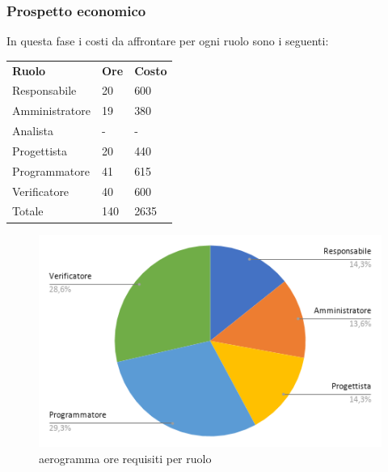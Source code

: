     \subsubsection{Prospetto economico}
    In questa fase i costi da affrontare per ogni ruolo sono i seguenti:

        \begin{center}
            \begin{table}[ht!]
                \centering
                \renewcommand{\arraystretch}{1.8}
                \begin{tabular}{p{75px} p{20px} p{30px}}
                    \rowcolor{logo!70} \textbf{Ruolo} & \textbf{Ore} & \textbf{Costo}\\
                    Responsabile & 20 & 600 \\
                    Amministratore & 19 & 380 \\
                    Analista & - & - \\
                    Progettista & 20 & 440 \\
                    Programmatore & 41 & 615 \\
                    Verificatore & 40 & 600  \\
                    Totale & 140 & 2635 \\
                \end{tabular}
            \end{table}
        \end{center}
        \pagebreak

        \begin{figure}[!h]
            \caption{aerogramma ore requisiti per ruolo}
            \vspace{5px}
            \includegraphics[scale=0.5]{../../../Images/Diagrammi/Diagramma a torta/ore validificazione.png}
            \centering
        \end{figure}  


